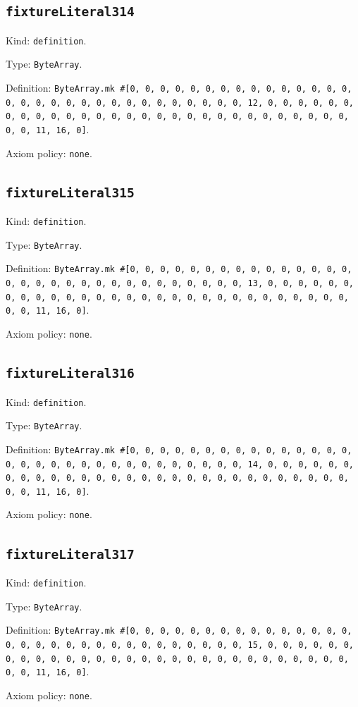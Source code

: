 \documentclass[11pt]{article}
\begin{document}
\subsection*{\texttt{fixtureLiteral314}}
\noindent Kind: \texttt{definition}.\par
\noindent Type: \texttt{ByteArray}.\par
\noindent Definition: \texttt{ByteArray.mk \#[0, 0, 0, 0, 0, 0, 0, 0, 0, 0, 0, 0, 0, 0, 0, 0, 0, 0, 0, 0, 0, 0, 0, 0, 0, 0, 0, 0, 0, 0, 0, 12, 0, 0, 0, 0, 0, 0, 0, 0, 0, 0, 0, 0, 0, 0, 0, 0, 0, 0, 0, 0, 0, 0, 0, 0, 0, 0, 0, 0, 0, 0, 0, 11, 16, 0]}.\par
\noindent Axiom policy: \texttt{none}.\par
\subsection*{\texttt{fixtureLiteral315}}
\noindent Kind: \texttt{definition}.\par
\noindent Type: \texttt{ByteArray}.\par
\noindent Definition: \texttt{ByteArray.mk \#[0, 0, 0, 0, 0, 0, 0, 0, 0, 0, 0, 0, 0, 0, 0, 0, 0, 0, 0, 0, 0, 0, 0, 0, 0, 0, 0, 0, 0, 0, 0, 13, 0, 0, 0, 0, 0, 0, 0, 0, 0, 0, 0, 0, 0, 0, 0, 0, 0, 0, 0, 0, 0, 0, 0, 0, 0, 0, 0, 0, 0, 0, 0, 11, 16, 0]}.\par
\noindent Axiom policy: \texttt{none}.\par
\subsection*{\texttt{fixtureLiteral316}}
\noindent Kind: \texttt{definition}.\par
\noindent Type: \texttt{ByteArray}.\par
\noindent Definition: \texttt{ByteArray.mk \#[0, 0, 0, 0, 0, 0, 0, 0, 0, 0, 0, 0, 0, 0, 0, 0, 0, 0, 0, 0, 0, 0, 0, 0, 0, 0, 0, 0, 0, 0, 0, 14, 0, 0, 0, 0, 0, 0, 0, 0, 0, 0, 0, 0, 0, 0, 0, 0, 0, 0, 0, 0, 0, 0, 0, 0, 0, 0, 0, 0, 0, 0, 0, 11, 16, 0]}.\par
\noindent Axiom policy: \texttt{none}.\par
\subsection*{\texttt{fixtureLiteral317}}
\noindent Kind: \texttt{definition}.\par
\noindent Type: \texttt{ByteArray}.\par
\noindent Definition: \texttt{ByteArray.mk \#[0, 0, 0, 0, 0, 0, 0, 0, 0, 0, 0, 0, 0, 0, 0, 0, 0, 0, 0, 0, 0, 0, 0, 0, 0, 0, 0, 0, 0, 0, 0, 15, 0, 0, 0, 0, 0, 0, 0, 0, 0, 0, 0, 0, 0, 0, 0, 0, 0, 0, 0, 0, 0, 0, 0, 0, 0, 0, 0, 0, 0, 0, 0, 11, 16, 0]}.\par
\noindent Axiom policy: \texttt{none}.\par
\end{document}
